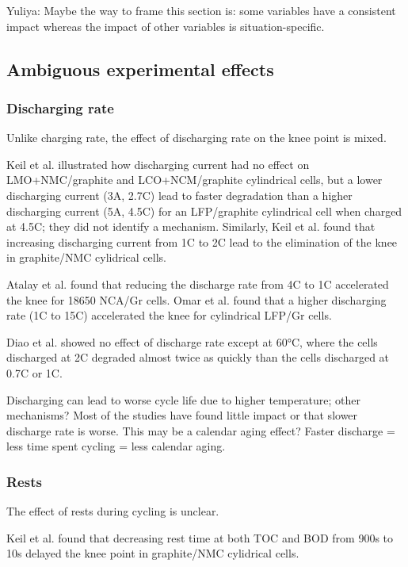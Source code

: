 \documentclass{article}
\begin{document}
Yuliya: Maybe the way to frame this section is: some variables have a consistent impact whereas the impact of other variables is situation-specific.

\subsection{Ambiguous experimental effects}

\subsubsection{Discharging rate}

Unlike charging rate, the effect of discharging rate on the knee point is mixed.

Keil et al.\cite{keil_charging_2016} illustrated how discharging current had no effect on LMO+NMC/graphite and LCO+NCM/graphite cylindrical cells, but a lower discharging current (3A, 2.7C) lead to faster degradation than a higher discharging current (5A, 4.5C) for an LFP/graphite cylindrical cell when charged at 4.5C; they did not identify a mechanism. 
Similarly, Keil et al.\cite{keil_linear_2019} found that increasing discharging current from 1C to 2C lead to the elimination of the knee in graphite/NMC cylidrical cells.

Atalay et al.\cite{atalay_theory_2020} found that reducing the discharge rate from 4C to 1C accelerated the knee for 18650 NCA/Gr cells.
Omar et al. \cite{omar_lithium_2014} found that a higher discharging rate (1C to 15C) accelerated the knee for cylindrical LFP/Gr cells.

Diao et al.\cite{diao_accelerated_2019} showed no effect of discharge rate except at 60°C, where the cells discharged at 2C degraded almost twice as quickly than the cells discharged at 0.7C or 1C. 

Discharging can lead to worse cycle life due to higher temperature; other mechanisms? Most of the studies have found little impact or that slower discharge rate is worse. This may be a calendar aging effect? Faster discharge = less time spent cycling = less calendar aging. 

\subsubsection{Rests}

The effect of rests during cycling is unclear.

Keil et al.\cite{keil_linear_2019} found that decreasing rest time at both TOC and BOD from 900s to 10s delayed the knee point in graphite/NMC cylidrical cells.
\end{document}
